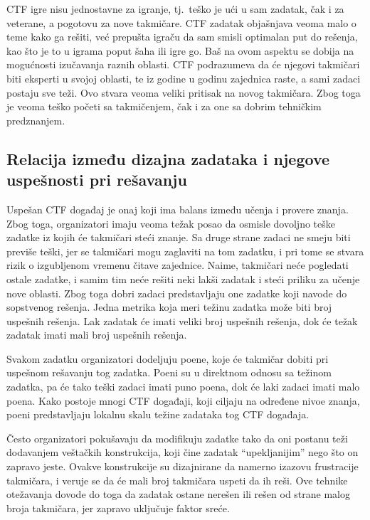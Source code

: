 \documentclass[12pt, a4paper, twocolumn]{article}
\begin{document}
CTF igre nisu jednostavne za igranje, tj.\ teško je ući u sam zadatak, čak i
za veterane, a pogotovu za nove takmičare. CTF zadatak objašnjava veoma
malo o teme kako ga rešiti, već prepušta igraču da sam smisli optimalan put
do rešenja, kao što je to u igrama poput šaha ili igre go. Baš na ovom aspektu
se dobija na mogućnosti izučavanja raznih oblasti. CTF podrazumeva da će
njegovi takmičari biti eksperti u svojoj oblasti, te iz godine u godinu
zajednica raste, a sami zadaci postaju sve teži. Ovo stvara veoma veliki 
pritisak na novog takmičara. Zbog toga je veoma teško početi sa takmičenjem,
čak i za one sa dobrim tehničkim predznanjem.

\subsection{Relacija između dizajna zadataka i njegove uspešnosti pri rešavanju}

Uspešan CTF događaj je onaj koji ima balans između učenja i provere znanja.
Zbog toga, organizatori imaju veoma težak posao da osmisle dovoljno teške 
zadatke iz kojih će takmičari steći znanje. Sa druge strane zadaci ne
smeju biti previše teški, jer se takmičari mogu zaglaviti na tom zadatku, i
pri tome se stvara rizik o izgubljenom vremenu čitave zajednice. Naime,
takmičari neće pogledati ostale zadatke, i samim tim neće rešiti neki lakši 
zadatak i steći priliku za učenje nove oblasti. Zbog toga dobri zadaci 
predstavljaju one zadatke koji navode do sopstvenog rešenja. Jedna metrika 
koja meri težinu zadatka može biti broj uspešnih rešenja. Lak zadatak će imati 
veliki broj uspešnih rešenja, dok će težak zadatak imati mali broj uspešnih 
rešenja.

Svakom zadatku organizatori dodeljuju poene, koje će takmičar dobiti pri
uspešnom rešavanju tog zadatka. Poeni su u direktnom odnosu sa težinom 
zadatka, pa će tako teški zadaci imati puno poena, dok će laki zadaci imati 
malo poena. Kako postoje mnogi CTF događaji, koji ciljaju na određene nivoe 
znanja, poeni predstavljaju lokalnu skalu težine zadataka tog CTF događaja.

Često organizatori pokušavaju da modifikuju zadatke tako da oni postanu teži
dodavanjem veštačkih konstrukcija, koji čine zadatak ``upekljanijim'' nego
što on zapravo jeste. Ovakve konstrukcije su dizajnirane da namerno izazovu 
frustracije takmičara, i veruje se da će mali broj takmičara uspeti da ih reši.
Ove tehnike otežavanja dovode do toga da zadatak ostane nerešen ili rešen
od strane malog broja takmičara, jer zapravo uključuje faktor sreće. 
\end{document}
